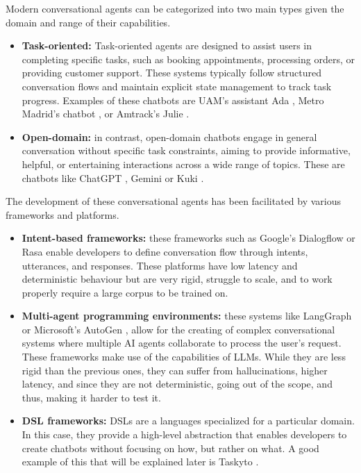 Modern conversational agents can be categorized into two main types
given the domain and range of their capabilities.
\begin{itemize}
  \item \textbf{Task-oriented:}
    Task-oriented agents are designed to assist users in completing specific tasks,
    such as booking appointments, processing orders, or providing customer support.
    These systems typically follow structured conversation flows
    and maintain explicit state management to track task progress.
    Examples of these chatbots are
    UAM's assistant Ada \autocite{AdaUAM},
    Metro Madrid's chatbot \autocite{MetroMadridEmpleara2025},
    or Amtrack's Julie \autocite{MeetJulieYour}.

  \item \textbf{Open-domain:}
    in contrast, open-domain chatbots
    engage in general conversation without specific task constraints,
    aiming to provide informative, helpful, or entertaining interactions across a wide range of topics.
    These are chatbots like ChatGPT \autocite{ChatGPT},
    Gemini \autocite{GoogleGemini} or Kuki \autocite{Kuki_ai}.
\end{itemize}

The development of these conversational agents
has been facilitated by various frameworks and platforms.
\begin{itemize}
  \item \textbf{Intent-based frameworks:}
    these frameworks such as Google's Dialogflow \autocite{Dialogflow} or Rasa \autocite{Rasa2020}
    enable developers to define conversation flow through intents, utterances, and responses.
    These platforms have low latency and deterministic behaviour
    but are very rigid, struggle to scale,
    and to work properly require a large corpus to be trained on.

  \item \textbf{Multi-agent programming environments:}
    these systems like LangGraph \autocite{LangGraph} or Microsoft's AutoGen \autocite{AutoGen},
    allow for the creating of complex conversational systems
    where multiple \ac{AI} agents collaborate to process the user's request.
    These frameworks make use of the capabilities of \acp{LLM}.
    While they are less rigid than the previous ones,
    they can suffer from hallucinations,
    higher latency, and since they are not deterministic,
    going out of the scope, and thus, making it harder to test it.

  \item \textbf{\ac{DSL} frameworks:}
    \acp{DSL} are a languages specialized for a particular domain.
    In this case, they provide a high-level abstraction
    that enables developers to create chatbots
    without focusing on how, but rather on what.
    A good example of this that will be explained later is Taskyto
    \autocite{sanchezcuadradoAutomatingDevelopmentTaskoriented2024}.
\end{itemize}


